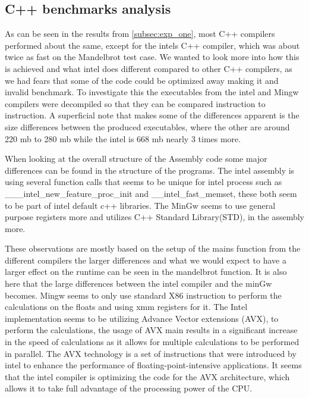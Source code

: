 \subsection{C++ benchmarks analysis}
As can be seen in the results from \cref{subsec:exp_one}, most C++ compilers performed about the same, except for the intels C++ compiler, which was about twice as fast on the Mandelbrot test case. We wanted to look more into how this is achieved and what intel does different compared to other C++ compilers, as we had fears that some of the code could be optimized away making it and invalid benchmark. To investigate this the executables from the intel and Mingw compilers were decompiled so that they can be compared instruction to instruction. A superficial note that makes some of the differences apparent is the size differences between the produced executables, where the other are around 220 mb to 280 mb while the intel is 668 mb nearly 3 times more.

When looking at the overall structure of the Assembly code some major differences can be found in the structure of the programs. The intel assembly is using several function calls that seems to be unique for intel process such as ___intel_new_feature_proc_init and __intel_fast_memset, these both seem to be part of intel default c++ libraries\cite{Intelassembly}. The MinGw seems to use general purpose registers more and utilizes C++ Standard Library(STD), in the assembly more.



These observations are mostly based on the setup of the mains function from the different compilers the larger differences and what we would expect to have a larger effect on the runtime can be seen in the mandelbrot function. It is also here that the large differences between the intel compiler and the minGw becomes. Mingw seems to only use standard X86 instruction\cite{X86} to perform the calculations on the floats and using xmm registers for it. The Intel implementation seems to be utilizing Advance Vector extensions (AVX)\cite{AVX}, to perform the calculations, the usage of AVX main results in a significant increase in the speed of calculations as it allows for multiple calculations to be performed in parallel. The AVX technology is a set of instructions that were introduced by intel to enhance the performance of floating-point-intensive applications\cite{AVX}. It seems that the intel compiler is optimizing the code for the AVX architecture, which allows it to take full advantage of the processing power of the CPU. 

